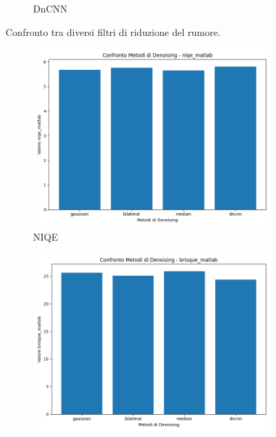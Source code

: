\begin{figure}[H]
\begin{subfigure}[t]{0.24\textwidth}
        \caption{DnCNN}
        \label{fig:dncnn}
    \end{subfigure}
    \caption{Confronto tra diversi filtri di riduzione del rumore.}
    \label{fig:confronto-filtri}
\end{figure}

\begin{figure}[H]
    \centering
    \begin{subfigure}[t]{0.45\textwidth}
        \centering
        \includegraphics[width=\linewidth]{../assets/denoising_comparison_niqe_matlab.png}
        \caption{NIQE}
        \label{fig:den_niqe}
    \end{subfigure}
    \hfill
    \begin{subfigure}[t]{0.45\textwidth}
        \centering
        \includegraphics[width=\linewidth]{../assets/denoising_comparison_brisque_matlab.png}

\end{subfigure}
\end{figure}
